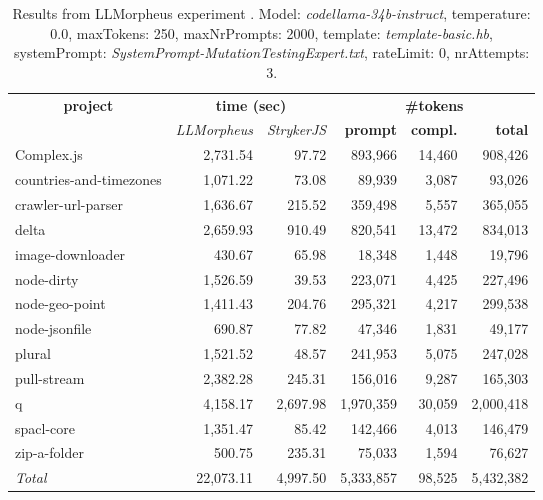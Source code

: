 
\begin{table*}[hbt!]
\centering
{\scriptsize
\begin{tabular}{l||r|r|r|r|r}
\multicolumn{1}{c|}{\bf project} & \multicolumn{2}{|c|}{\bf time (sec)} & \multicolumn{3}{|c|}{\bf \#tokens} \\
               & {\it LLMorpheus} & {\it StrykerJS} & {\bf prompt} & {\bf compl.} & {\bf total} \\
\hline
  Complex.js & 2,731.54 & 97.72 & 893,966 & 14,460 & 908,426 \\ 
countries-and-timezones & 1,071.22 & 73.08 & 89,939 & 3,087 & 93,026 \\ 
crawler-url-parser & 1,636.67 & 215.52 & 359,498 & 5,557 & 365,055 \\ 
delta & 2,659.93 & 910.49 & 820,541 & 13,472 & 834,013 \\ 
image-downloader & 430.67 & 65.98 & 18,348 & 1,448 & 19,796 \\ 
node-dirty & 1,526.59 & 39.53 & 223,071 & 4,425 & 227,496 \\ 
node-geo-point & 1,411.43 & 204.76 & 295,321 & 4,217 & 299,538 \\ 
node-jsonfile & 690.87 & 77.82 & 47,346 & 1,831 & 49,177 \\ 
plural & 1,521.52 & 48.57 & 241,953 & 5,075 & 247,028 \\ 
pull-stream & 2,382.28 & 245.31 & 156,016 & 9,287 & 165,303 \\ 
q & 4,158.17 & 2,697.98 & 1,970,359 & 30,059 & 2,000,418 \\ 
spacl-core & 1,351.47 & 85.42 & 142,466 & 4,013 & 146,479 \\ 
zip-a-folder & 500.75 & 235.31 & 75,033 & 1,594 & 76,627 \\ 
\hline
  \textit{Total} & 22,073.11 & 4,997.50 & 5,333,857 & 98,525 & 5,432,382 \\
  \end{tabular}
  }
  \\[2mm]
  \caption{Results from LLMorpheus experiment .
    Model: \textit{codellama-34b-instruct}, 
    temperature: 0.0, 
    maxTokens: 250, 
    maxNrPrompts: 2000, 
    template: \textit{template-basic.hb}, 
    systemPrompt: \textit{SystemPrompt-MutationTestingExpert.txt}, 
    rateLimit: 0, 
    nrAttempts: 3.  
  }
  \label{table:Cost:run390:codellama-34b-instruct:template-basic.hb:0.0}
\end{table*}